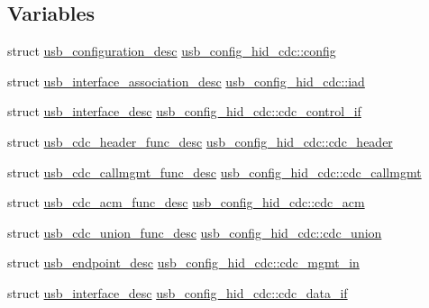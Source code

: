 \subsection*{\-Variables}
\begin{DoxyCompactItemize}
\item 
struct \hyperlink{structusb__configuration__desc}{usb\-\_\-configuration\-\_\-desc} \hyperlink{group___p_i_o_s___u_s_b___d_e_s_c_ga41025645591a4ff38c6bfb3bf799cdf1}{usb\-\_\-config\-\_\-hid\-\_\-cdc\-::config}
\item 
struct \*
\hyperlink{structusb__interface__association__desc}{usb\-\_\-interface\-\_\-association\-\_\-desc} \hyperlink{group___p_i_o_s___u_s_b___d_e_s_c_ga0dc1bab4cabd04ace89b858ba3f7b259}{usb\-\_\-config\-\_\-hid\-\_\-cdc\-::iad}
\item 
struct \hyperlink{structusb__interface__desc}{usb\-\_\-interface\-\_\-desc} \hyperlink{group___p_i_o_s___u_s_b___d_e_s_c_ga9cc4f55f507f420505ac9114cf7b9df3}{usb\-\_\-config\-\_\-hid\-\_\-cdc\-::cdc\-\_\-control\-\_\-if}
\item 
struct \hyperlink{structusb__cdc__header__func__desc}{usb\-\_\-cdc\-\_\-header\-\_\-func\-\_\-desc} \hyperlink{group___p_i_o_s___u_s_b___d_e_s_c_gaedeb1a14bf5f0cfea7d70e97389205c8}{usb\-\_\-config\-\_\-hid\-\_\-cdc\-::cdc\-\_\-header}
\item 
struct \hyperlink{structusb__cdc__callmgmt__func__desc}{usb\-\_\-cdc\-\_\-callmgmt\-\_\-func\-\_\-desc} \hyperlink{group___p_i_o_s___u_s_b___d_e_s_c_ga1463830a390b3358935b4b39260c5762}{usb\-\_\-config\-\_\-hid\-\_\-cdc\-::cdc\-\_\-callmgmt}
\item 
struct \hyperlink{structusb__cdc__acm__func__desc}{usb\-\_\-cdc\-\_\-acm\-\_\-func\-\_\-desc} \hyperlink{group___p_i_o_s___u_s_b___d_e_s_c_gafafcc283fdd68e1f1f71b102c226fc23}{usb\-\_\-config\-\_\-hid\-\_\-cdc\-::cdc\-\_\-acm}
\item 
struct \hyperlink{structusb__cdc__union__func__desc}{usb\-\_\-cdc\-\_\-union\-\_\-func\-\_\-desc} \hyperlink{group___p_i_o_s___u_s_b___d_e_s_c_gafdccd743e5f58edeace549e15f512d44}{usb\-\_\-config\-\_\-hid\-\_\-cdc\-::cdc\-\_\-union}
\item 
struct \hyperlink{structusb__endpoint__desc}{usb\-\_\-endpoint\-\_\-desc} \hyperlink{group___p_i_o_s___u_s_b___d_e_s_c_gae83909d6ab80cf2e1ce3ecd22d1dc9ec}{usb\-\_\-config\-\_\-hid\-\_\-cdc\-::cdc\-\_\-mgmt\-\_\-in}
\item 
struct \hyperlink{structusb__interface__desc}{usb\-\_\-interface\-\_\-desc} \hyperlink{group___p_i_o_s___u_s_b___d_e_s_c_ga80b1d19d38b5379618c5e66f0da9dcb2}{usb\-\_\-config\-\_\-hid\-\_\-cdc\-::cdc\-\_\-data\-\_\-if}

\end{DoxyCompactItemize}

